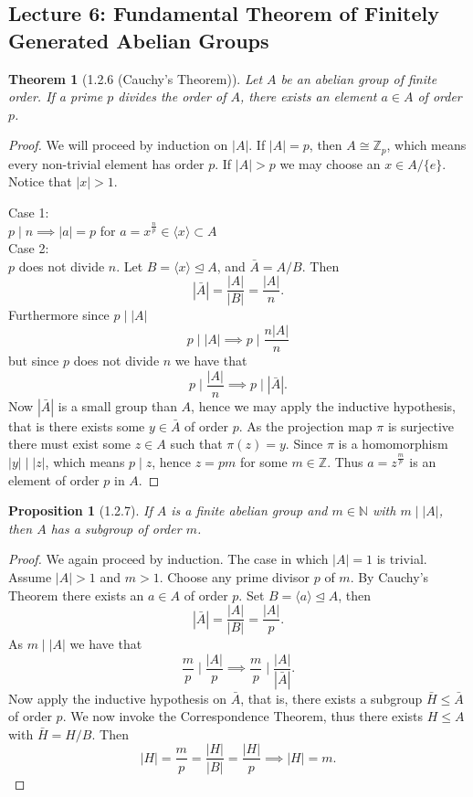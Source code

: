 \documentclass[11pt,leqno,oneside]{amsart}
\newcommand{\N}{{\mathbb N}} %
\newcommand{\Z}{{\mathbb Z}} %
\newcommand{\normsubgroup}{\mathrel{\unlhd}}
\newcommand{\isom}{\mathrel{\cong}}
\newtheorem*{thm*}{Theorem}
\newtheorem*{prop*}{Proposition}
\theoremstyle{definition}
\numberwithin{equation}{section}
\begin{document}
\subsection*{Lecture 6: Fundamental Theorem of Finitely Generated Abelian Groups}

\begin{thm*}[1.2.6 (Cauchy's Theorem)]
  Let \(A\) be an abelian group of finite order. If a prime \(p\) divides the
  order of \(A\), there exists an element \(a \in A\) of order \(p\).
\end{thm*}

\begin{proof}
  We will proceed by induction on \(|A|\). If \(|A|=p\), then \(A \isom \Z_p\),
  which means every non-trivial element has order \(p\). If \(|A| > p\) we may
  choose an \(x \in A/\{e\}\). Notice that \(|x| > 1\).
  
  \noindent Case 1:\\ \(p \mid n \implies |a|=p\) for \(a=x^{\frac{n}{p}} \in \langle x
  \rangle \subset A\)\\
  
  \noindent Case 2:\\ \(p\) does not divide \(n\). Let \(B=\langle x \rangle
  \normsubgroup A\), and \(\bar{A}=A /B\). Then
  \[|\bar{A}|=\frac{|A|}{|B|}=\frac{|A|}{n}.\]
  Furthermore since \(p \mid |A|\) 
  \[p \mid |A| \implies p \mid \frac{n|A|}{n}\]
  but since \(p\) does not divide \(n\) we have that 
  \[p \mid \frac{|A|}{n}\implies p \mid |\bar{A}|.\]
  Now \(|\bar{A}|\) is a small group than \(A\), hence we may apply the
  inductive hypothesis, that is there exists some \(y \in \bar{A}\) of order
  \(p\). As the projection map \(\pi\) is surjective there must exist some \(z
  \in A\) such that \(\pi(z)=y\). Since \(\pi\) is a homomorphism \(|y| \mid
  |z|\), which means \(p \mid z\), hence \(z=pm\) for some \(m \in \Z\). Thus
  \(a=z^{\frac{m}{p}}\) is an element of order \(p\) in \(A\).
\end{proof}

\begin{prop*}[1.2.7]
If \(A\)   is a finite abelian group and \(m \in \N\) with \(m \mid |A|\), then
\(A\) has a subgroup of order \(m\).
\end{prop*}
\begin{proof}
  We again proceed by induction. The case in which \(|A|=1\) is trivial. Assume \(|A|>1\) and \(m>1\). Choose
  any prime divisor \(p\) of \(m\). By Cauchy's Theorem there exists an \(a \in
  A\) of order \(p\). Set \(B=\langle a\rangle \unlhd A\), then
  \[|\bar{A}|=\frac{|A|}{|B|}=\frac{|A|}{p}.\]
  As \(m \mid |A|\) we have that
  \[\frac{m}{p} \mid \frac{|A|}{p} \implies \frac{m}{p} \mid
    \frac{|A|}{|\bar{A}|}.\]
  Now apply the inductive hypothesis on \(\bar{A}\), that is, there exists a subgroup \(\bar{H} \le \bar{A}\) of order
  \(p\). We now invoke the Correspondence Theorem, thus there exists \(H \le A\) with \(\bar{H}=H/B\). Then 
  \[|H|=\frac{m}{p}=\frac{|H|}{|B|}=\frac{|H|}{p} \implies |H|=m.\]
\end{proof}
\end{document}
